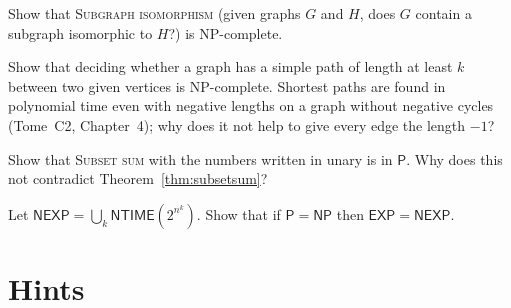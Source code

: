 \begin{exercise}[$\star$]\label{ex:subgraphiso}
Show that \textup{\textsc{Subgraph isomorphism}} (given graphs $G$ and $H$, does $G$ contain a subgraph isomorphic to $H$?) is NP-complete.
\end{exercise}

\begin{exercise}[$\star$]\label{ex:longestpath}
Show that deciding whether a graph has a simple path of length at least $k$ between two given vertices is NP-complete. Shortest paths are found in polynomial time even with negative lengths on a graph without negative cycles (Tome~C2, Chapter~4); why does it not help to give every edge the length $-1$?
\end{exercise}

\begin{exercise}[$\star$]\label{ex:unarysubset}
Show that \textup{\textsc{Subset sum}} with the numbers written in unary is in $\mathsf P$. Why does this not contradict Theorem~\ref{thm:subsetsum}?
\end{exercise}

\begin{exercise}[$\star\star\star$]\label{ex:nexp}
Let $\mathsf{NEXP}=\bigcup_k\mathsf{NTIME}(2^{n^k})$. Show that if $\mathsf P=\mathsf{NP}$ then $\mathsf{EXP}=\mathsf{NEXP}$.
\end{exercise}

\section{Hints}

